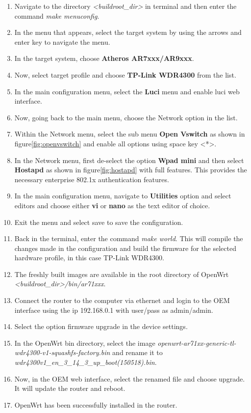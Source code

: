 \begin{enumerate}
	\item Navigate to the directory \textit{<buildroot\_dir>} in terminal and then enter the command \textit{make menuconfig}.
	\item In the menu that appears, select the target system by using the arrows and enter key to navigate the menu.
	\item In the target system, choose \textbf{Atheros AR7xxx/AR9xxx}.
	\item Now, select target profile and choose \textbf{TP-Link WDR4300} from the list.
	\item In the main configuration menu, select the \textbf{Luci} menu and enable luci web interface.
	\item Now, going back to the main menu, choose the Network option in the list.
	\item	Within the Network menu, select the sub menu \textbf{Open Vswitch} as shown in figure\ref{fig:openvswitch} and enable all options using space key <*>.
	\item	In the Network menu, first de-select the option \textbf{Wpad mini} and then select \textbf{Hostapd} as shown in figure\ref{fig:hostapd} with full features. This provides the necessary enterprise 802.1x authentication features.
	\item	In the main configuration menu, navigate to \textbf{Utilities} option and select editors and choose either \textbf{vi} or \textbf{nano} as the text editor of choice.
	\item	Exit the menu and select save to save the configuration.
	\item	Back in the terminal, enter the command \textit{make world}. This will compile the changes made in the configuration and build the firmware for the selected hardware profile, in this case TP-Link WDR4300.
	\item	The freshly built images are available in the root directory of OpenWrt \textit{<buildroot\_dir>/bin/ar71xxx}.
	\item	Connect the router to the computer via ethernet and login to the OEM interface using the ip 192.168.0.1 with user/pass as admin/admin.
	\item	Select the option firmware upgrade in the device settings.
	\item	In the OpenWrt bin directory, select the image \textit{openwrt-ar71xx-generic-tl-wdr4300-v1-squashfs-factory.bin} and rename it to 
	\textit{wdr4300v1\_en\_3\_14\_3\_up\_boot(150518).bin}.
	\item	Now, in the OEM web interface, select the renamed file and choose upgrade. It will update the router and reboot.
	\item	OpenWrt has been successfully installed in the router.
	
\end{enumerate}

